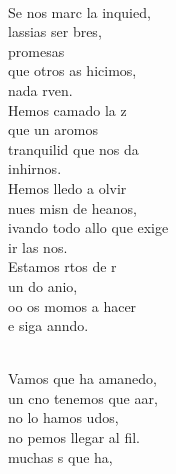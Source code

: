 \begin{cancion}%
	       \chord{(}{**)}{    }\\
	Se nos marc la inquied, \\
	lassias  ser bres,\\
	promesas\\
	que otros as hicimos,\\
	 nada rven.\\
	Hemos camado la z\\
	que un aromos\\
	  tranquilid que nos da\\
	 inhirnos.\\
\jump
	Hemos lledo a olvir\\
	nues misn de heanos, \\
	ivando todo allo que exige\\
	ir las nos.\\
	Estamos rtos de r\\
	un do anio,\\
	oo os momos a hacer\\
	e siga anndo.\\\jump\\
	\begin{chorus}%
	Vamos que  ha amanedo,\\
	un cno tenemos que aar,\\
	no lo hamos udos,\\
	no pemos llegar al fil.\\
	 muchas s que ha,\\

\end{chorus}
\end{cancion}

